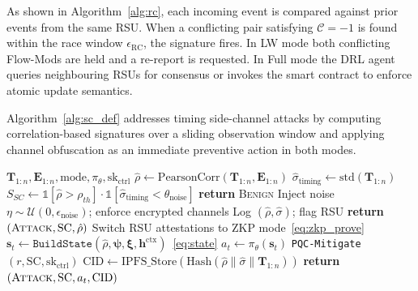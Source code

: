 As shown in Algorithm~\ref{alg:rc}, each incoming event
is compared against prior events from the same RSU. When
a conflicting pair satisfying $\mathcal{C}=-1$ is found
within the race window $\epsilon_{\mathrm{RC}}$, the
signature fires. In LW mode both conflicting Flow-Mods
are held and a re-report is requested. In Full mode the
DRL agent queries neighbouring RSUs for consensus or
invokes the smart contract to enforce atomic update
semantics.

Algorithm~\ref{alg:sc_def} addresses timing side-channel
attacks by computing correlation-based signatures over a
sliding observation window and applying channel obfuscation
as an immediate preventive action in both modes.

\begin{algorithm}[H]
\caption{Timing Side-Channel Detection and Mitigation
(\texttt{SC-Defend})}
\label{alg:sc_def}
\begin{algorithmic}[1]
\small
{}
  {$\mathbf{T}_{1:n},\mathbf{E}_{1:n},\mathrm{mode},
  \pi_\theta,\mathrm{sk}_{\mathrm{ctrl}}$}
  \State $\hat{\rho} \gets
    \mathrm{PearsonCorr}(\mathbf{T}_{1:n},\mathbf{E}_{1:n})$
  \State $\hat{\sigma}_{\mathrm{timing}} \gets
    \mathrm{std}(\mathbf{T}_{1:n})$
  \State $S_{SC} \gets
    \mathbb{1}[\hat{\rho}>\rho_{th}]
    \cdot\mathbb{1}
    [\hat{\sigma}_{\mathrm{timing}}<\theta_{\mathrm{noise}}]$
    \State \textbf{return} \textsc{Benign}
  \EndIf
  \State Inject noise $\eta \sim
    \mathcal{U}(0,\epsilon_{\mathrm{noise}})$;
    enforce encrypted channels
    \State Log $(\hat{\rho},\hat{\sigma})$; flag RSU
    \State \textbf{return}
      $(\textsc{Attack},\mathrm{SC},\hat{\rho})$
  \EndIf
  \State Switch RSU attestations to ZKP mode~\eqref{eq:zkp_prove}
  \State $\mathbf{s}_t \gets \texttt{BuildState}
    (\hat{\rho},\boldsymbol{\psi},\boldsymbol{\xi},
    \mathbf{h}^{\mathrm{ctx}})$~\eqref{eq:state}
  \State $a_t \gets \pi_\theta(\mathbf{s}_t)$
    \State \texttt{PQC-Mitigate}$(r,\mathrm{SC},
      \mathrm{sk}_{\mathrm{ctrl}})$
  \EndIf
  \State $\mathrm{CID} \gets \mathrm{IPFS\_Store}
    (\mathrm{Hash}(\hat{\rho}\|\hat{\sigma}\|
    \mathbf{T}_{1:n}))$
  \State \textbf{return}
    $(\textsc{Attack},\mathrm{SC},a_t,\mathrm{CID})$
\EndProcedure
\end{algorithmic}
\end{algorithm}

